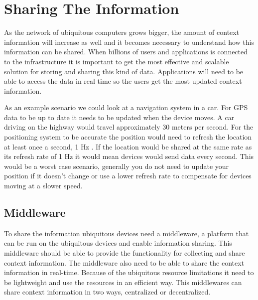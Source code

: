 \section{Sharing The Information}
As the network of ubiquitous computers grows bigger, the amount of context information will increase as well and it becomes necessary to understand how this information can be shared. When billions of users and applications is connected to the infrastructure it is important to get the most effective and scalable solution for storing and sharing this kind of data. Applications will need to be able to access the data in real time so the users get the most updated context information. 

As an example scenario we could look at a navigation system in a car. For GPS data to be up to date it needs to be updated when the device moves. A car driving on the highway would travel approximately 30 meters per second. For the positioning system to be accurate the position would need to refresh the location at least once a second, 1 Hz \cite{portas2010validity}. If the location would be shared at the same rate as its refresh rate of 1 Hz it would mean devices would send data every second. This would be a worst case scenario, generally you do not need to update your position if it doesn't change or use a lower refresh rate to compensate for devices moving at a slower speed.

\subsection{Middleware}
To share the information ubiquitous devices need a middleware, a platform that can be run on the ubiquitous devices and enable information sharing. This middleware should be able to provide the functionality for collecting and share context information. The middleware also need to be able to share the context information in real-time. Because of the ubiquitous resource limitations it need to be lightweight and use the resources in an efficient way. This middlewares can share context information in two ways, centralized or decentralized.

